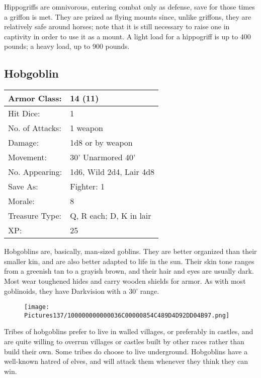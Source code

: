 \documentclass[a4paper,twoside,openany,10pt]{book}
\begin{document}
\begin{multicols}{2}
Hippogriffs are omnivorous, entering combat only as defense, save for those times a griffon is met. They are prized as flying mounts since, unlike griffons, they are relatively safe around horses; note that it is still necessary to raise one in captivity in order to use it as a mount. A light load for a hippogriff is up to 400 pounds; a heavy load, up to 900 pounds.

\subsection*{Hobgoblin}\label{hobgoblin}

\begin{tabularx}{0.50\textwidth}{@{}lX@{}}
Armor Class: & 14 (11) \\\hline
Hit Dice: & 1 \\\hline
No. of Attacks: & 1 weapon \\\hline
Damage: & 1d8 or by weapon \\\hline
Movement: & 30' Unarmored 40' \\\hline
No. Appearing: & 1d6, Wild 2d4, Lair 4d8 \\\hline
Save As: & Fighter: 1 \\\hline
Morale: & 8 \\\hline
Treasure Type: & Q, R each; D, K in lair \\\hline
XP: & 25 \\\hline
\end{tabularx}

Hobgoblins are, basically, man-sized goblins. They are better organized than their smaller kin, and are also better adapted to life in the sun. Their skin tone ranges from a greenish tan to a grayish brown, and their hair and eyes are usually dark. Most wear toughened hides and carry wooden shields for armor. As with most goblinoids, they have Darkvision with a 30' range.

\begin{wrapfigure}{r}{0.25\textwidth}
	\texttt{[image: Pictures137/100000000000036C00000854C489D4D92DD04B97.png]}
\end{wrapfigure}

Tribes of hobgoblins prefer to live in walled villages, or preferably in castles, and are quite willing to overrun villages or castles built by other races rather than build their own. Some tribes do choose to live underground. Hobgoblins have a well-known hatred of elves, and will attack them whenever they think they can win.


\end{multicols}
\end{document}
